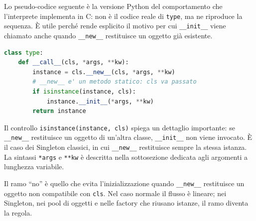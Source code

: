 \documentclass[12pt]{extarticle}
\begin{document}
\noindent Lo pseudo-codice seguente è la versione Python del comportamento che l'interprete implementa in C: non è il codice reale di \texttt{type}, ma ne riproduce la sequenza. È utile perché rende esplicito il motivo per cui \texttt{\_\_init\_\_} viene chiamato anche quando \texttt{\_\_new\_\_} restituisce un oggetto già esistente.

\begin{lstlisting}[language=Python]
class type:
    def __call__(cls, *args, **kw):
        instance = cls.__new__(cls, *args, **kw)
        # __new__ e' un metodo statico: cls va passato
        if isinstance(instance, cls):
            instance.__init__(*args, **kw)
        return instance
\end{lstlisting}

\noindent Il controllo \texttt{isinstance(instance, cls)} spiega un dettaglio importante: se \texttt{\_\_new\_\_} restituisce un oggetto di un'altra classe, \texttt{\_\_init\_\_} non viene invocato. È il caso dei Singleton classici, in cui \texttt{\_\_new\_\_} restituisce sempre la stessa istanza. La sintassi \texttt{*args} e \texttt{**kw} è descritta nella sottosezione dedicata agli argomenti a lunghezza variabile.

\begin{center}
\end{center}

\noindent Il ramo ``no'' è quello che evita l'inizializzazione quando \texttt{\_\_new\_\_} restituisce un oggetto non compatibile con \texttt{cls}. Nel caso normale il flusso è lineare; nei Singleton, nei pool di oggetti e nelle factory che riusano istanze, il ramo diventa la regola.
\end{document}
